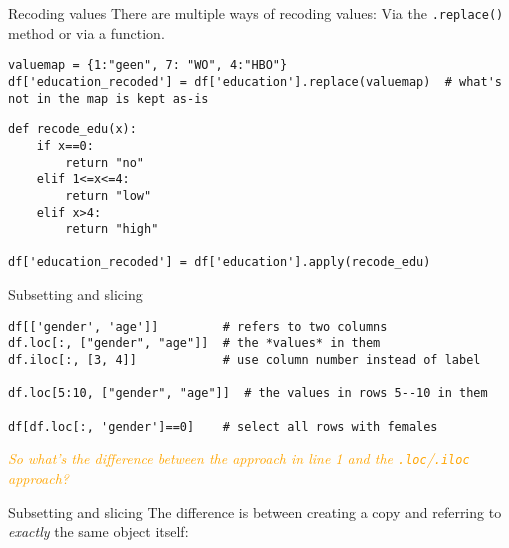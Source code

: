 \begin{frame}[fragile]{Recoding values}
There are multiple ways of recoding values: Via the \texttt{.replace()} method or via a function.

\begin{verbatim}
valuemap = {1:"geen", 7: "WO", 4:"HBO"}
df['education_recoded'] = df['education'].replace(valuemap)  # what's not in the map is kept as-is
\end{verbatim}


\begin{verbatim}
def recode_edu(x):
    if x==0:
        return "no"
    elif 1<=x<=4:
        return "low"
    elif x>4:
        return "high"
    
df['education_recoded'] = df['education'].apply(recode_edu)
\end{verbatim}



\end{frame}





\begin{frame}[fragile]{Subsetting and slicing}
\begin{verbatim}
df[['gender', 'age']]         # refers to two columns
df.loc[:, ["gender", "age"]]  # the *values* in them
df.iloc[:, [3, 4]]            # use column number instead of label

df.loc[5:10, ["gender", "age"]]  # the values in rows 5--10 in them

df[df.loc[:, 'gender']==0]    # select all rows with females
\end{verbatim}    
\pause

\emph{\textcolor{orange}{So what's the difference between the approach in line 1 and the \texttt{.loc}/\texttt{.iloc} approach?}}
\end{frame}



\begin{frame}{Subsetting and slicing}
  The difference is between creating a copy and referring to \emph{exactly} the same object itself:
\end{frame}








